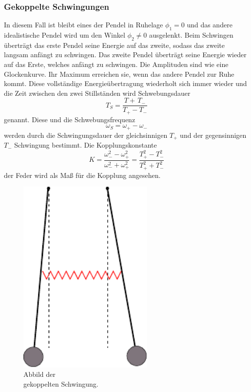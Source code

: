 \subsubsection{Gekoppelte Schwingungen}
\label{sub:Gekoppelt}
\begin{minipage}[t]{0.5\textwidth}
In diesem Fall ist bleibt eines der Pendel in Ruhelage $\phi_1=0$ und das andere idealistische Pendel wird um den Winkel $\phi_2 \neq 0$ ausgelenkt.
Beim Schwingen überträgt das erste Pendel seine Energie auf das zweite, sodass das zweite langsam anfängt zu schwingen.
Das zweite Pendel überträgt seine Energie wieder auf das Erste, welches anfängt zu schwingen.
Die Amplituden sind wie eine Glockenkurve. 
Ihr Maximum erreichen sie, wenn das andere Pendel zur Ruhe kommt.
Diese vollständige Energieübertragung wiederholt sich immer wieder und die Zeit zwischen den zwei Stillständen wird Schwebungsdauer 
\begin{equation}
    T_S=\frac{T+\,T_-}{T_+-T_-}
    \label{eqn:TS}
\end{equation}
genannt. Diese und die Schwebungsfrequenz
\begin{equation}
    \omega_S = \omega_+ - \omega_-
    \label{eqn:omegaS}
\end{equation}
werden durch die Schwingungsdauer der gleichsinnigen $T_+$ und der gegensinnigen $T_-$ Schwingung bestimmt.
Die Kopplungskonstante
\begin{equation}
    K = \frac{\omega_-^2 -\omega_+^2}{\omega_-^2 + \omega_+^2} = \frac{T_+^2 - T_-^2}{T_+^2 + T_-^2}
    \label{eqn:K}
\end{equation}
der Feder wird als Maß für die Kopplung angesehen.
\end{minipage}
\begin{minipage}[t]{0.5\textwidth}
    \begin{figure}[H]
        \centering
        \includegraphics[width=0.6\textwidth]{build/Abb_3.pdf}
        \caption{Abbild der \\gekoppelten Schwingung. \cite{V106}}
        \label{fig:gekoppelt}
      \end{figure}
\end{minipage}
